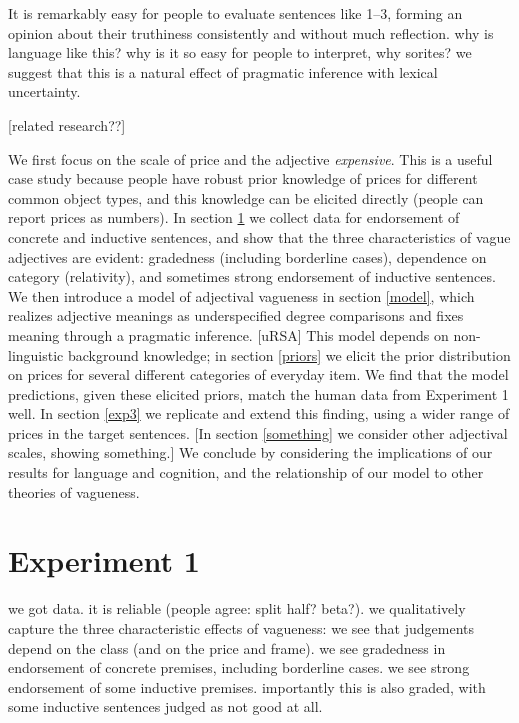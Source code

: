 \documentclass[11pt]{amsart}
\newcommand{\ndg}[1]{{\color{ForestGreen}[#1]}}
\begin{document}
It is remarkably easy for people to evaluate sentences like 1--3, forming an opinion about their truthiness consistently and without much reflection.
why is language like this? why is it so easy for people to interpret, why sorites? we suggest that this is a natural effect of pragmatic inference with lexical uncertainty.

\ndg{related research??}


We first focus on the scale of price and the adjective \emph{expensive}. This is a useful case study because people have robust prior knowledge of prices for different common object types, and this knowledge can be elicited directly (people can report prices as numbers).
In section \ref{exp1} we collect data for endorsement of concrete and inductive sentences, and show that the three characteristics of vague adjectives are evident: gradedness (including borderline cases), dependence on category (relativity), and sometimes strong endorsement of inductive sentences.
We then introduce a model of adjectival vagueness in section \ref{model}, which realizes adjective meanings as underspecified degree comparisons and fixes meaning through a pragmatic inference. \ndg{uRSA}
This model depends on non-linguistic background knowledge; in section \ref{priors} we elicit the prior distribution on prices for several different categories of everyday item.
We find that the model predictions, given these elicited priors, match the human data from Experiment 1 well.
In section \ref{exp3} we replicate and extend this finding, using a wider range of prices in the target sentences.
\ndg{In section \ref{something} we consider other adjectival scales, showing something.}
We conclude by considering the implications of our results for language and cognition, and the relationship of our model to other theories of vagueness.



\section{Experiment 1}
\label{exp1}

we got data. it is reliable (people agree: split half? beta?).
we qualitatively capture the three characteristic effects of vagueness:
  we see that judgements depend on the class (and on the price and frame).
  we see gradedness in endorsement of concrete premises, including borderline cases.
  we see strong endorsement of some inductive premises. importantly this is also graded, with some inductive sentences judged as not good at all.
  
\end{document}
